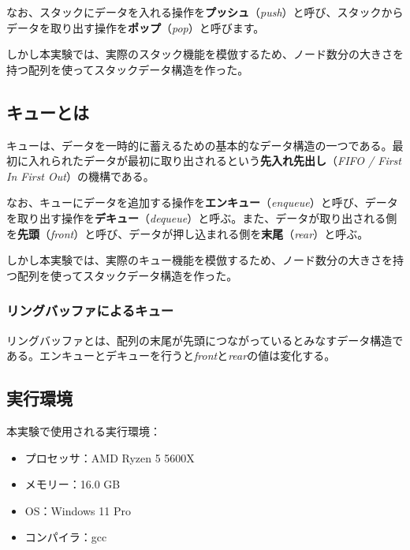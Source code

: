 \documentclass[a4j, titlepage]{jarticle}
\begin{document}
    なお、スタックにデータを入れる操作を\textbf{プッシュ}（\textit{push}）と呼び、スタックからデータを取り出す操作を\textbf{ポップ}（\textit{pop}）と呼びます\cite{bib:boyoh}。%

    しかし本実験では、実際のスタック機能を模倣するため、ノード数分の大きさを持つ配列を使ってスタックデータ構造を作った。

    \subsection{キューとは}
    キューは、データを一時的に蓄えるための基本的なデータ構造の一つである。最初に入れられたデータが最初に取り出されるという\textbf{先入れ先出し}（\textit{FIFO / First In First Out}）の機構である。\cite{bib:boyoh}
    
    なお、キューにデータを追加する操作を\textbf{エンキュー}（\textit{enqueue}）と呼び、データを取り出す操作を\textbf{デキュー}（\textit{dequeue}）と呼ぶ。また、データが取り出される側を\textbf{先頭}（\textit{front}）と呼び、データが押し込まれる側を\textbf{末尾}（\textit{rear}）と呼ぶ\cite{bib:boyoh}。

    しかし本実験では、実際のキュー機能を模倣するため、ノード数分の大きさを持つ配列を使ってスタックデータ構造を作った。

        \subsubsection{リングバッファによるキュー}
        リングバッファとは、配列の末尾が先頭につながっているとみなすデータ構造である\cite{bib:boyoh}。エンキューとデキューを行うと\textit{front}と\textit{rear}の値は変化する。


    
    \subsection{実行環境}
    本実験で使用される実行環境：
    \begin{screen}
        \begin{itemize}
            \item プロセッサ：AMD Ryzen 5 5600X
            \item メモリー：16.0 GB
            \item OS：Windows 11 Pro
            \item コンパイラ：gcc
        \end{itemize}    
    \end{screen}
\end{document}
